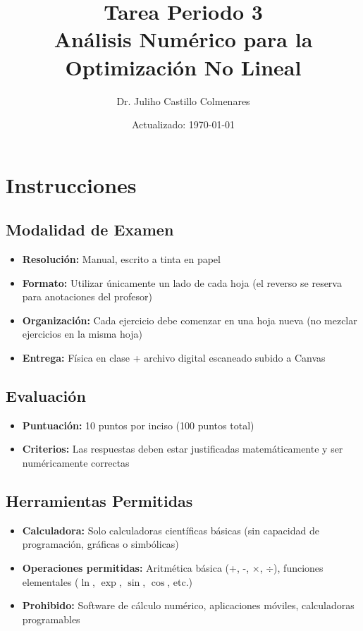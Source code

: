 \documentclass[12pt,a4paper]{article}
\title{\textbf{Tarea Periodo 3} \\ \large Análisis Numérico para la Optimización No Lineal}
\author{Dr. Juliho Castillo Colmenares}
\date{Actualizado: \today}
\begin{document}
\maketitle

\section*{Instrucciones}

\subsection*{Modalidad de Examen}
\begin{itemize}
\item \textbf{Resolución:} Manual, escrito a tinta en papel
\item \textbf{Formato:} Utilizar únicamente un lado de cada hoja (el reverso se reserva para anotaciones del profesor)
\item \textbf{Organización:} Cada ejercicio debe comenzar en una hoja nueva (no mezclar ejercicios en la misma hoja)
\item \textbf{Entrega:} Física en clase + archivo digital escaneado subido a Canvas
\end{itemize}

\subsection*{Evaluación}
\begin{itemize}
\item \textbf{Puntuación:} 10 puntos por inciso (100 puntos total)
\item \textbf{Criterios:} Las respuestas deben estar justificadas matemáticamente y ser numéricamente correctas
\end{itemize}

\subsection*{Herramientas Permitidas}
\begin{itemize}
\item \textbf{Calculadora:} Solo calculadoras científicas básicas (sin capacidad de programación, gráficas o simbólicas)
\item \textbf{Operaciones permitidas:} Aritmética básica (+, -, \(\times\), \(\div\)), funciones elementales (\(\ln\), \(\exp\), \(\sin\), \(\cos\), etc.)
\item \textbf{Prohibido:} Software de cálculo numérico, aplicaciones móviles, calculadoras programables
\end{itemize}
\end{document}
